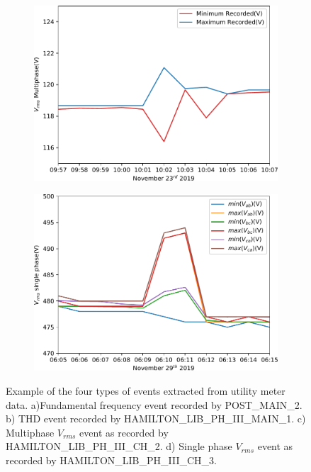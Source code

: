 \begin{figure}[ht!]
\begin{subfigure}{.45\textwidth}
        \caption{}
        \label{expdes:fig:gt_example:thd}
    \end{subfigure}
    \begin{subfigure}{.45\textwidth}
        \centering
        \includegraphics[width=1\linewidth]{img/napali_eval/gt/gt_vpoly_example.pdf}
        \caption{}
        \label{expdes:fig:gt_example:vpoly}
    \end{subfigure}\hspace{5mm}
    \begin{subfigure}{.45\textwidth}
        \centering
        \includegraphics[width=1\linewidth]{img/napali_eval/gt/gt_vsingle_example.pdf}
        \caption{}
        \label{expdes:fig:gt_example:vsingle}
    \end{subfigure}

    \caption{Example of the four types of events extracted from utility meter data.
    a)Fundamental frequency event recorded by POST\_MAIN\_2.
    b) THD event recorded by HAMILTON\_LIB\_PH\_III\_MAIN\_1.
    c) Multiphase $V_{rms}$ event as recorded by HAMILTON\_LIB\_PH\_III\_CH\_2.
    d) Single phase $V_{rms}$ event as recorded by HAMILTON\_LIB\_PH\_III\_CH\_3.}

    \label{expdes:fig:gt_example}
\end{figure}


